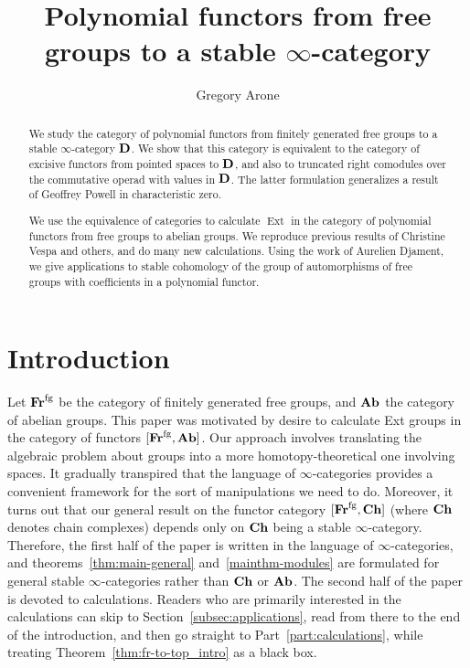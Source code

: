 \documentclass[psamsfonts]{amsart}
\title{Polynomial functors from free groups to a stable $\infty$-category}
\author{Gregory Arone}
\theoremstyle{plain}
\theoremstyle{definition}
\theoremstyle{remark}
\newcommand{\catname}[1]{{\normalfont\textbf{#1}}}
\newcommand{\fr}{\allfr^{\mathrm{fg}}}
\newcommand{\allfr}{\catname{Fr}}
\newcommand{\ab}{\catname{Ab}}
\newcommand{\ch}{\catname{Ch}}
\DeclareMathOperator{\ext}{Ext}
\begin{document}
\begin{abstract}
We study the category of polynomial functors from finitely generated free groups to a stable $\infty$-category $\catname{D}$. We show that this category is equivalent to the category of excisive functors from pointed spaces to $\catname{D}$, and also to truncated right comodules over the commutative operad with values in $\catname{D}$. The latter formulation generalizes a result of Geoffrey Powell in characteristic zero. 

We use the equivalence of categories to calculate $\ext$ in the category of polynomial functors from free groups to abelian groups. We reproduce previous results of Christine Vespa and others, and do many new calculations. Using the work of Aurelien Djament, we give applications to stable cohomology of the group of automorphisms of free groups with coefficients in a polynomial functor.
\end{abstract}
\maketitle

\tableofcontents



\section{Introduction} %
Let $\fr$ be the category of finitely generated free groups, and $\ab$ the category of abelian groups. This paper was motivated by desire to calculate Ext groups in the category of functors $[\fr, \ab]$. Our approach involves translating the algebraic problem about groups into a more homotopy-theoretical one involving spaces. It gradually transpired that the language of $\infty$-categories provides a convenient framework for the sort of manipulations we need to do. Moreover, it turns out that our general result on the functor category $[\fr, \ch]$ (where $\ch$ denotes chain complexes) depends only on $\ch$ being a stable $\infty$-category. Therefore, the first half of the paper is written in the language of $\infty$-categories, and theorems~\ref{thm:main-general} and~\ref{mainthm-modules} are formulated for general stable $\infty$-categories rather than $\ch$ or $\ab$.
The second half of the paper is devoted to calculations. Readers who are primarily interested in the calculations can skip to Section~\ref{subsec:applications}, read from there to the end of the introduction, and then go straight to Part~\ref{part:calculations}, while treating Theorem~\ref{thm:fr-to-top_intro} as a black box.
\end{document}
